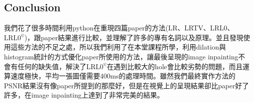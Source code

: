 \documentclass{article}
\begin{document}
\begin{CJK*}{UTF8}{bkai}
\section{Conclusion}
我們花了很多時間利用python在重現四篇paper的方法(LR、LRTV、LRL0、{$\mathrm{LRL0^{\psi}}$})，跟paper結果進行比較，並理解了許多的專有名詞以及原理。並且發現使用這些方法的不足之處，所以我們利用了在本堂課程所學，利用dilation與histogram統計的方式優化paper所使用的方法，讓最後呈現的image inpainting不會有任何的缺失值，解決了{$\mathrm{LRL0^{\psi}}$}在遇到比較大的hole會比較劣勢的問題，而且運算速度極快，平均一張圖僅需要400ms的處理時間。雖然我們最終實作方法的PSNR結果沒有像paper所提到的那麼好，但是在視覺上的呈現結果卻比paper好了許多，在image inpainting上達到了非常完美的結果。





\small



\end{CJK*}
\end{document}
